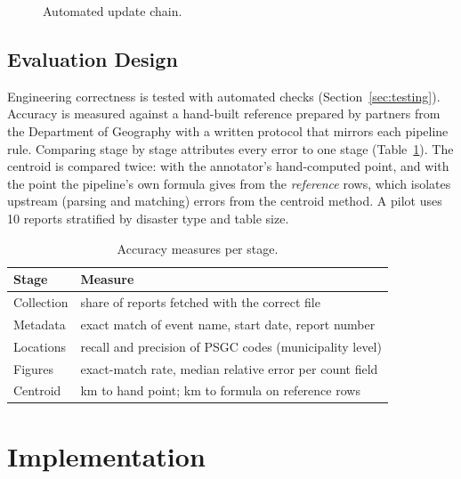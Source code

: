\documentclass[acmtog]{acmart}
\begin{document}
\begin{figure}[t]
  \centering
  \caption{Automated update chain.}
  \label{fig:update}
\end{figure}

\subsection{Evaluation Design}

Engineering correctness is tested with automated checks (Section~\ref{sec:testing}). Accuracy is
measured against a hand-built reference prepared by partners from the Department of Geography
with a written protocol that mirrors each pipeline rule. Comparing stage by stage attributes every
error to one stage (Table~\ref{tab:eval}). The centroid is compared twice: with the annotator's
hand-computed point, and with the point the pipeline's own formula gives from the
\emph{reference} rows, which isolates upstream (parsing and matching) errors from the centroid
method. A pilot uses 10 reports stratified by disaster type and table size.

\begin{table}[t]
  \caption{Accuracy measures per stage.}
  \label{tab:eval}
  \small
  \begin{tabular}{p{2.1cm}p{5.6cm}}
    \toprule
    Stage & Measure \\
    \midrule
    Collection & share of reports fetched with the correct file \\
    Metadata & exact match of event name, start date, report number \\
    Locations & recall and precision of PSGC codes (municipality level) \\
    Figures & exact-match rate, median relative error per count field \\
    Centroid & km to hand point; km to formula on reference rows \\
    \bottomrule
  \end{tabular}
\end{table}

\section{Implementation}
\label{sec:impl}
\end{document}
